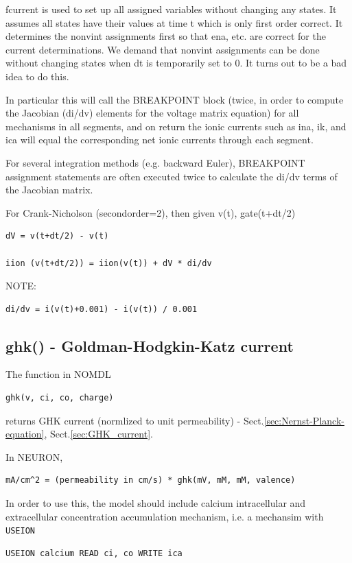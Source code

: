 fcurrent is used to set up all assigned variables  without changing any
states.  It assumes all states have their values at time t which is
only first order correct. It determines the nonvint assignments first
so that ena, etc. are correct for the current determinations. We
demand that nonvint assignments can be done without changing states when
dt is temporarily set to 0. It turns out to be a bad idea to do this.


In particular this will call the BREAKPOINT block (twice, in order to compute
the Jacobian (di/dv) elements for the voltage matrix equation) for all
mechanisms in all segments, and on return the ionic currents such as ina, ik,
and ica will equal the corresponding net ionic currents through each segment.

For several integration methods (e.g. backward Euler), BREAKPOINT assignment
statements are often executed twice to calculate the di/dv terms of the Jacobian
matrix.

For Crank-Nicholson (secondorder=2), then given v(t), gate(t+dt/2)
\begin{verbatim}
dV = v(t+dt/2) - v(t)

iion (v(t+dt/2)) = iion(v(t)) + dV * di/dv
\end{verbatim}

NOTE: 
\begin{verbatim}
di/dv = i(v(t)+0.001) - i(v(t)) / 0.001
\end{verbatim}


\subsection{ghk() - Goldman-Hodgkin-Katz current}

The function in NOMDL 
\begin{verbatim}
ghk(v, ci, co, charge)
\end{verbatim}
returns GHK current (normlized to unit permeability) -
Sect.\ref{sec:Nernst-Planck-equation}, Sect.\ref{sec:GHK_current}.


In NEURON,
\begin{verbatim}
mA/cm^2 = (permeability in cm/s) * ghk(mV, mM, mM, valence)
\end{verbatim}


In order to use this, the model should include calcium intracellular and
extracellular concentration accumulation mechanism, i.e. a mechansim with
\verb!USEION!
\begin{verbatim}
USEION calcium READ ci, co WRITE ica
\end{verbatim}


